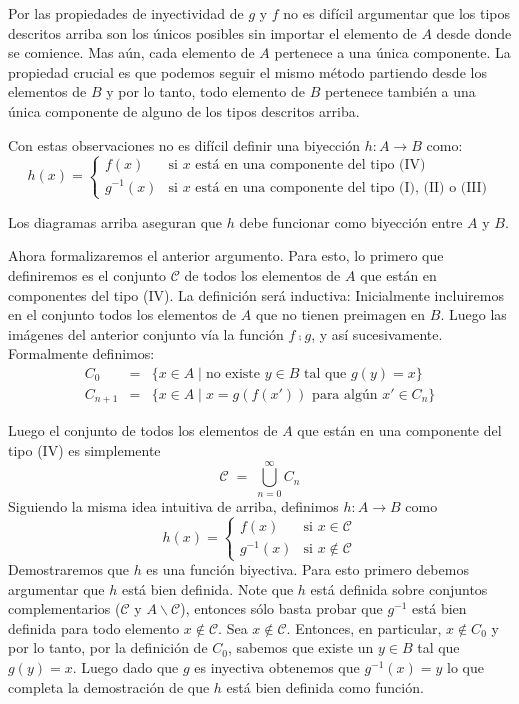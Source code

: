Por las propiedades de inyectividad de $g$ y $f$ no es difícil argumentar que los tipos descritos arriba son los 
únicos posibles sin importar el elemento de $A$ desde donde se comience.
Mas aún, cada elemento de $A$ pertenece a una única componente.
La propiedad crucial es que podemos seguir el mismo método partiendo desde los elementos de $B$ y por lo tanto, todo elemento
de $B$ pertenece también a una única componente de alguno de los tipos descritos arriba.

Con estas observaciones no es difícil definir una biyección $h:A\to B$ como:
\[
h(x) = \left\{ \begin{array}{ll}
f(x) & \text{si }x\text{ está en una componente del tipo (IV)} \\
g^{-1}(x) & \text{si }x\text{ está en una componente del tipo (I), (II) o (III)} 
\end{array} \right.
\]

Los diagramas arriba aseguran que $h$ debe funcionar como biyección entre $A$ y $B$.

Ahora formalizaremos el anterior argumento. Para esto, lo primero que definiremos es el conjunto $\mathcal C$ de todos
los elementos de $A$ que están en componentes del tipo (IV). La definición será inductiva:
Inicialmente incluiremos en el conjunto todos los elementos de $A$ que no tienen preimagen en $B$.
Luego las imágenes del anterior conjunto vía la función $f\comp g$, y así sucesivamente.
Formalmente definimos:
\begin{eqnarray*}
C_0 & = & \{x\in A\mid \text{no existe }y\in B\text{ tal que }g(y)=x\} \\
C_{n+1} & = & \{x\in A\mid x=g(f(x'))\text{ para algún }x'\in C_n\}
\end{eqnarray*}

\newcommand{\CC}{\mathcal{C}}
Luego el conjunto de todos los elementos de $A$ que están en una componente del tipo (IV) es simplemente
\[
\CC \; = \; \bigcup_{n=0}^\infty C_n
\]
Siguiendo la misma idea intuitiva de arriba, definimos $h:A\to B$ como
\[
h(x) = \left\{ \begin{array}{ll}
f(x) & \text{si }x\in \CC \\
g^{-1}(x) & \text{si }x\notin \CC
\end{array} \right.
\]
Demostraremos que $h$ es una función biyectiva. Para esto primero debemos
argumentar que $h$ está bien definida.
Note que $h$ está definida sobre conjuntos complementarios ($\CC$ y $A\smallsetminus \CC$), entonces
sólo basta probar que $g^{-1}$ está bien definida para todo elemento $x\notin \CC$.
Sea $x\notin \CC$. Entonces, en particular, $x\notin C_0$ y por lo tanto, por la definición de $C_0$,
sabemos que existe un $y\in B$ tal que $g(y)=x$. Luego dado que $g$ es inyectiva obtenemos que
$g^{-1}(x)=y$ lo que completa la demostración de que $h$ está bien definida como función.

